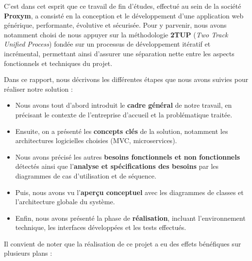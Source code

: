 C'est dans cet esprit que ce travail de fin d'études, effectué au sein de la société \textbf{Proxym}, a consisté en la conception et le développement d'une application web générique, performante, évolutive et sécurisée. Pour y parvenir, nous avons notamment choisi de nous appuyer sur la méthodologie \textbf{2TUP} (\textit{Two Track Unified Process}) fondée sur un processus de développement itératif et incrémental, permettant ainsi d'assurer une séparation nette entre les aspects fonctionnels et techniques du projet.

Dans ce rapport, nous décrivons les différentes étapes que nous avons suivies pour réaliser notre solution :
\begin{itemize}
    \item Nous avons tout d'abord introduit le \textbf{cadre général} de notre travail, en précisant le contexte de l'entreprise d'accueil et la problématique traitée.
    \item Ensuite, on a présenté les \textbf{concepts clés} de la solution, notamment les architectures logicielles choisies (MVC, microservices).
    \item Nous avons précisé les autres \textbf{besoins fonctionnels et non fonctionnels} détectés ainsi que l'\textbf{analyse et spécifications des besoins} par les diagrammes de cas d'utilisation et de séquence.
    \item Puis, nous avons vu l'\textbf{aperçu conceptuel} avec les diagrammes de classes et l'architecture globale du système.
    \item Enfin, nous avons présenté la phase de \textbf{réalisation}, incluant l'environnement technique, les interfaces développées et les tests effectués.
\end{itemize}

Il convient de noter que la réalisation de ce projet a eu des effets bénéfiques sur plusieurs plans :

